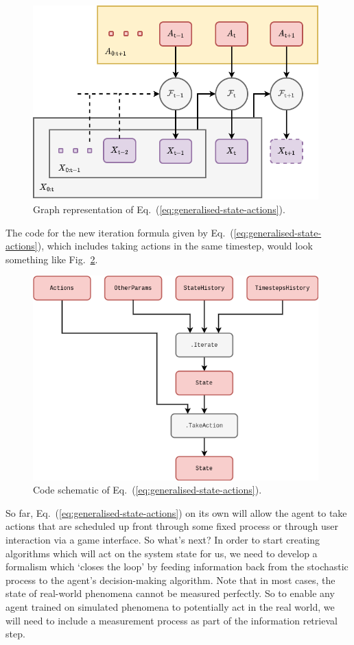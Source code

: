 \begin{figure}[h]
\centering
\includegraphics[width=11cm]{images/chapter-9-fundamental-loop-with-actions.drawio.png}
\caption{Graph representation of Eq.~(\ref{eq:generalised-state-actions}).}
\label{fig:fundamental-loop-with-actions}
\end{figure}

The code for the new iteration formula given by Eq.~(\ref{eq:generalised-state-actions}), which includes taking actions in the same timestep, would look something like Fig.~\ref{fig:iterations-with-actions}.

\begin{figure}[h]
\centering
\includegraphics[width=11cm]{images/chapter-9-iterations-with-actions.drawio.png}
\caption{Code schematic of Eq.~(\ref{eq:generalised-state-actions}).}
\label{fig:iterations-with-actions}
\end{figure}

So far, Eq.~(\ref{eq:generalised-state-actions}) on its own will allow the agent to take actions that are scheduled up front through some fixed process or through user interaction via a game interface. So what's next? In order to start creating algorithms which will act on the system state for us, we need to develop a formalism which `closes the loop' by feeding information back from the stochastic process to the agent's decision-making algorithm. Note that in most cases, the state of real-world phenomena cannot be measured perfectly. So to enable any agent trained on simulated phenomena to potentially act in the real world, we will need to include a measurement process as part of the information retrieval step.

